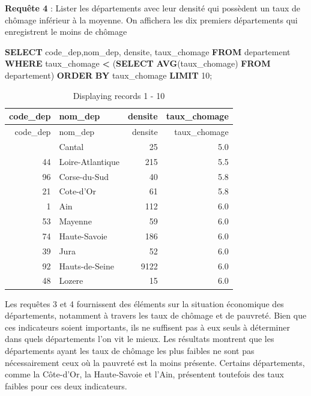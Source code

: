 \documentclass[mstat,12pt]{unswthesis}
\newenvironment{Shaded}{\begin{snugshade}}{\end{snugshade}}
\newcommand{\DecValTok}[1]{\textcolor[rgb]{0.00,0.00,0.81}{#1}}
\newcommand{\FunctionTok}[1]{\textcolor[rgb]{0.13,0.29,0.53}{\textbf{#1}}}
\newcommand{\KeywordTok}[1]{\textcolor[rgb]{0.13,0.29,0.53}{\textbf{#1}}}
\newcommand{\NormalTok}[1]{#1}
\newcommand{\OperatorTok}[1]{\textcolor[rgb]{0.81,0.36,0.00}{\textbf{#1}}}
\begin{document}
\medskip

\textbf{Requête 4} : Lister les départements avec leur densité qui
possèdent un taux de chômage inférieur à la moyenne. On affichera les
dix premiers départements qui enregistrent le moins de chômage

\begin{Shaded}
\begin{Highlighting}[]
\KeywordTok{SELECT}\NormalTok{ code\_dep,nom\_dep, densite, taux\_chomage}
\KeywordTok{FROM}\NormalTok{ departement}
\KeywordTok{WHERE}\NormalTok{ taux\_chomage }\OperatorTok{\textless{}}\NormalTok{ (}\KeywordTok{SELECT} \FunctionTok{AVG}\NormalTok{(taux\_chomage) }\KeywordTok{FROM}\NormalTok{ departement)}
\KeywordTok{ORDER} \KeywordTok{BY}\NormalTok{ taux\_chomage}
\KeywordTok{LIMIT} \DecValTok{10}\NormalTok{;}
\end{Highlighting}
\end{Shaded}

\begin{longtable}[]{@{}rlrr@{}}
\caption{Displaying records 1 - 10}\tabularnewline
\toprule\noalign{}
code\_dep & nom\_dep & densite & taux\_chomage \\
\midrule\noalign{}
\endfirsthead
\toprule\noalign{}
code\_dep & nom\_dep & densite & taux\_chomage \\
\midrule\noalign{}
\endhead
\bottomrule\noalign{}
\endlastfoot
15 & Cantal & 25 & 5.0 \\
44 & Loire-Atlantique & 215 & 5.5 \\
96 & Corse-du-Sud & 40 & 5.8 \\
21 & Cote-d'Or & 61 & 5.8 \\
1 & Ain & 112 & 6.0 \\
53 & Mayenne & 59 & 6.0 \\
74 & Haute-Savoie & 186 & 6.0 \\
39 & Jura & 52 & 6.0 \\
92 & Hauts-de-Seine & 9122 & 6.0 \\
48 & Lozere & 15 & 6.0 \\
\end{longtable}

\medskip

Les requêtes 3 et 4 fournissent des éléments sur la situation économique
des départements, notamment à travers les taux de chômage et de
pauvreté. Bien que ces indicateurs soient importants, ils ne suffisent
pas à eux seuls à déterminer dans quels départements l'on vit le mieux.
Les résultats montrent que les départements ayant les taux de chômage
les plus faibles ne sont pas nécessairement ceux où la pauvreté est la
moins présente. Certains départements, comme la Côte-d'Or, la
Haute-Savoie et l'Ain, présentent toutefois des taux faibles pour ces
deux indicateurs.
\end{document}

